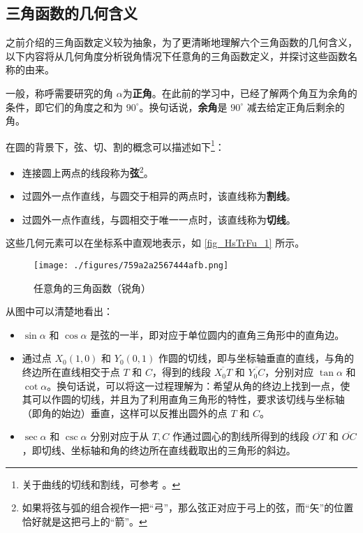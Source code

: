 \subsection{三角函数的几何含义}

之前介绍的三角函数定义较为抽象，为了更清晰地理解六个三角函数的几何含义，以下内容将从几何角度分析锐角情况下任意角的三角函数定义，并探讨这些函数名称的由来。

一般，称呼需要研究的角 $\alpha$为\textbf{正角}。在此前的学习中，已经了解两个角互为余角的条件，即它们的角度之和为 $90^\circ$。换句话说，\textbf{余角}是 $90^\circ$ 减去给定正角后剩余的角。

在圆的背景下，弦、切、割的概念可以描述如下\footnote{关于曲线的切线和割线，可参考 。}：
\begin{itemize}
\item 连接圆上两点的线段称为\textbf{弦}\footnote{如果将弦与弧的组合视作一把“弓”，那么弦正对应于弓上的弦，而“矢”的位置恰好就是这把弓上的“箭”。}。
\item 过圆外一点作直线，与圆交于相异的两点时，该直线称为\textbf{割线}。
\item 过圆外一点作直线，与圆相交于唯一一点时，该直线称为\textbf{切线}。
\end{itemize}

这些几何元素可以在坐标系中直观地表示，如 \autoref{fig_HsTrFu_1} 所示。

\begin{figure}[ht]
\centering
\texttt{[image: ./figures/759a2a2567444afb.png]}
\caption{任意角的三角函数（锐角）} \label{fig_HsTrFu_1}
\end{figure}
从图中可以清楚地看出：
\begin{itemize}
\item $\sin\alpha$ 和 $\cos\alpha$ 是弦的一半，即对应于单位圆内的直角三角形中的直角边。
\item 通过点 $X_0(1,0)$ 和 $Y_0(0,1)$ 作圆的切线，即与坐标轴垂直的直线，与角的终边所在直线相交于点 $T$ 和 $C$，得到的线段 $\overline{X_0T}$ 和 $\overline{Y_0C}$，分别对应 $\tan\alpha$ 和 $\cot\alpha$。换句话说，可以将这一过程理解为：希望从角的终边上找到一点，使其可以作圆的切线，并且为了利用直角三角形的特性，要求该切线与坐标轴（即角的始边）垂直，这样可以反推出圆外的点 $T$ 和 $C$。
\item $\sec\alpha$ 和 $\csc\alpha$ 分别对应于从 $T,C$ 作通过圆心的割线所得到的线段 $\overline{OT}$ 和 $\overline{OC}$，即切线、坐标轴和角的终边所在直线截取出的三角形的斜边。
\end{itemize}

